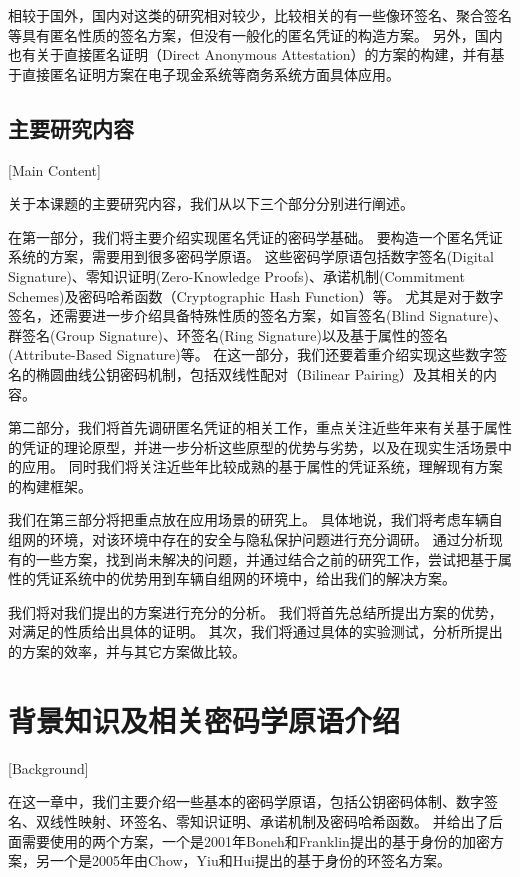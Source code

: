 相较于国外，国内对这类的研究相对较少，比较相关的有一些像环签名、聚合签名等具有匿名性质的签名方案\cite{张严2012匿名凭证方案研究进展,胡江红2017可证明安全的基于证书聚合签名方案}，但没有一般化的匿名凭证的构造方案。
另外，国内也有关于直接匿名证明（Direct Anonymous Attestation）的方案的构建\cite{张严2012匿名凭证方案研究进展}，并有基于直接匿名证明方案在电子现金系统等商务系统方面具体应用\cite{柳欣2016基于DAA-A的改进可授权电子现金系统,柳欣2016基于DAA的轻量级多商家多重息票系统}。

\section{主要研究内容}[Main Content]

关于本课题的主要研究内容，我们从以下三个部分分别进行阐述。

在第一部分，我们将主要介绍实现匿名凭证的密码学基础。
要构造一个匿名凭证系统的方案，需要用到很多密码学原语。
这些密码学原语包括数字签名(Digital Signature)、零知识证明(Zero-Knowledge Proofs)、承诺机制(Commitment Schemes)及密码哈希函数（Cryptographic Hash Function）等。
尤其是对于数字签名，还需要进一步介绍具备特殊性质的签名方案，如盲签名(Blind Signature)、群签名(Group Signature)、环签名(Ring Signature)以及基于属性的签名(Attribute-Based Signature)等。
在这一部分，我们还要着重介绍实现这些数字签名的椭圆曲线公钥密码机制，包括双线性配对（Bilinear Pairing）及其相关的内容。

第二部分，我们将首先调研匿名凭证的相关工作，重点关注近些年来有关基于属性的凭证的理论原型，并进一步分析这些原型的优势与劣势，以及在现实生活场景中的应用。
同时我们将关注近些年比较成熟的基于属性的凭证系统，理解现有方案的构建框架。

我们在第三部分将把重点放在应用场景的研究上。
具体地说，我们将考虑车辆自组网的环境，对该环境中存在的安全与隐私保护问题进行充分调研。
通过分析现有的一些方案，找到尚未解决的问题，并通过结合之前的研究工作，尝试把基于属性的凭证系统中的优势用到车辆自组网的环境中，给出我们的解决方案。

我们将对我们提出的方案进行充分的分析。
我们将首先总结所提出方案的优势，对满足的性质给出具体的证明。
其次，我们将通过具体的实验测试，分析所提出的方案的效率，并与其它方案做比较。

\chapter{背景知识及相关密码学原语介绍}[Background]

在这一章中，我们主要介绍一些基本的密码学原语，包括公钥密码体制、数字签名、双线性映射、环签名、零知识证明、承诺机制及密码哈希函数。
并给出了后面需要使用的两个方案，一个是2001年Boneh和Franklin提出的基于身份的加密方案\cite{boneh2001identity}，另一个是2005年由Chow，Yiu和Hui提出的基于身份的环签名方案\cite{chow2005efficient}。


